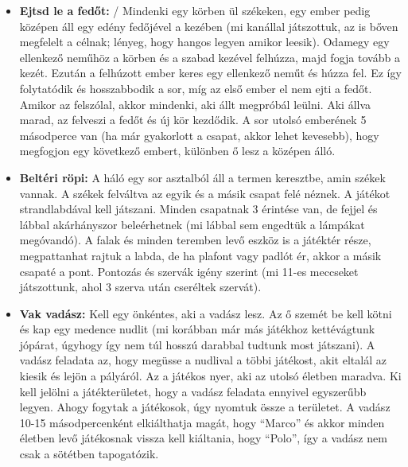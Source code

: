 \documentclass[a4paper, 12pt, twoside, openright]{article}
\begin{document}
\begin{itemize}
\item \textbf{Ejtsd le a fedőt:} / Mindenki egy körben ül székeken, egy ember pedig középen áll egy edény fedőjével a kezében (mi kanállal játszottuk, az is bőven megfelelt a célnak; lényeg, hogy hangos legyen amikor leesik). Odamegy egy ellenkező neműhöz a körben és a szabad kezével felhúzza, majd fogja tovább a kezét. Ezután a felhúzott ember keres egy ellenkező neműt és húzza fel. Ez így folytatódik és hosszabbodik a sor, míg az első ember el nem ejti a fedőt. Amikor az felszólal, akkor mindenki, aki állt megpróbál leülni. Aki állva marad, az felveszi a fedőt és új kör kezdődik. A sor utolsó emberének 5 másodperce van (ha már gyakorlott a csapat, akkor lehet kevesebb), hogy megfogjon egy következő embert, különben ő lesz a középen álló.

\item \textbf{Beltéri röpi:} A háló egy sor asztalból áll a termen keresztbe, amin székek vannak. A székek felváltva az egyik és a másik csapat felé néznek. A játékot strandlabdával kell játszani. Minden csapatnak 3 érintése van, de fejjel és lábbal akárhányszor beleérhetnek (mi lábbal sem engedtük a lámpákat megóvandó). A falak és minden teremben levő eszköz is a játéktér része, megpattanhat rajtuk a labda, de ha plafont vagy padlót ér, akkor a másik csapaté a pont. Pontozás és szervák igény szerint (mi 11-es meccseket játszottunk, ahol 3 szerva után cseréltek szervát).

\item \textbf{Vak vadász:} Kell egy önkéntes, aki a vadász lesz. Az ő szemét be kell kötni és kap egy medence nudlit (mi korábban már más játékhoz kettévágtunk jópárat, úgyhogy így nem túl hosszú darabbal tudtunk most játszani). A vadász feladata az, hogy megüsse a nudlival a többi játékost, akit eltalál az kiesik és lejön a pályáról. Az a játékos nyer, aki az utolsó életben maradva. Ki kell jelölni a játékterületet, hogy a vadász feladata ennyivel egyszerűbb legyen. Ahogy fogytak a játékosok, úgy nyomtuk össze a területet. A vadász 10-15 másodpercenként elkiálthatja magát, hogy “Marco” és akkor minden életben levő játékosnak vissza kell kiáltania, hogy “Polo”, így a vadász nem csak a sötétben tapogatózik.


\end{itemize}
\end{document}
